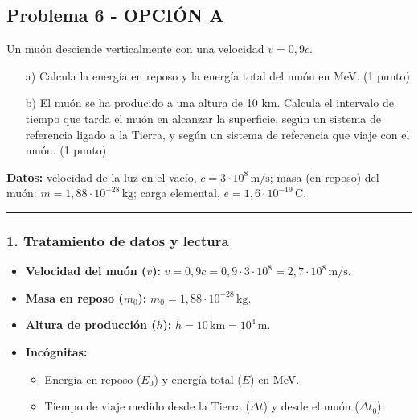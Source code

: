 \newpage

\subsection{Problema 6 - OPCIÓN A}
\label{subsec:6A_2015_jul_ext}

\begin{cajaenunciado}
Un muón desciende verticalmente con una velocidad $v=0,9c$.
\begin{enumerate}
    \item[a)] Calcula la energía en reposo y la energía total del muón en MeV. (1 punto)
    \item[b)] El muón se ha producido a una altura de 10 km. Calcula el intervalo de tiempo que tarda el muón en alcanzar la superficie, según un sistema de referencia ligado a la Tierra, y según un sistema de referencia que viaje con el muón. (1 punto)
\end{enumerate}
\textbf{Datos:} velocidad de la luz en el vacío, $c=3\cdot10^{8}\,\text{m/s}$; masa (en reposo) del muón: $m=1,88\cdot10^{-28}\,\text{kg}$; carga elemental, $e=1,6\cdot10^{-19}\,\text{C}$.
\end{cajaenunciado}
\hrule

\subsubsection*{1. Tratamiento de datos y lectura}
\begin{itemize}
    \item \textbf{Velocidad del muón ($v$):} $v=0,9c = 0,9 \cdot 3\cdot10^8 = 2,7\cdot10^8 \, \text{m/s}$.
    \item \textbf{Masa en reposo ($m_0$):} $m_0 = 1,88\cdot10^{-28}\,\text{kg}$.
    \item \textbf{Altura de producción ($h$):} $h = 10 \, \text{km} = 10^4 \, \text{m}$.
    \item \textbf{Incógnitas:}
        \begin{itemize}
            \item Energía en reposo ($E_0$) y energía total ($E$) en MeV.
            \item Tiempo de viaje medido desde la Tierra ($\Delta t$) y desde el muón ($\Delta t_0$).
        \end{itemize}
\end{itemize}

